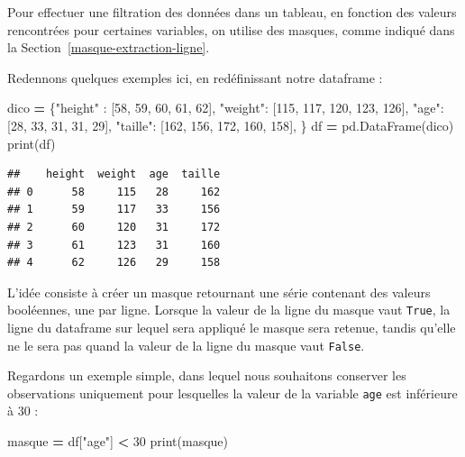 \documentclass[12pt,]{book}
\newenvironment{Shaded}{\begin{snugshade}}{\end{snugshade}}
\newcommand{\DecValTok}[1]{\textcolor[rgb]{0.00,0.00,0.81}{#1}}
\newcommand{\StringTok}[1]{\textcolor[rgb]{0.31,0.60,0.02}{#1}}
\newcommand{\OperatorTok}[1]{\textcolor[rgb]{0.81,0.36,0.00}{\textbf{#1}}}
\newcommand{\BuiltInTok}[1]{#1}
\newcommand{\NormalTok}[1]{#1}
\numberwithin{equation}{section}
\numberwithin{countremarque}{section}
\begin{document}
Pour effectuer une filtration des données dans un tableau, en fonction
des valeurs rencontrées pour certaines variables, on utilise des
masques, comme indiqué dans la Section~\ref{masque-extraction-ligne}.

Redennons quelques exemples ici, en redéfinissant notre dataframe :

\begin{Shaded}
\begin{Highlighting}[]
\NormalTok{dico }\OperatorTok{=}\NormalTok{ \{}\StringTok{"height"}\NormalTok{ : [}\DecValTok{58}\NormalTok{, }\DecValTok{59}\NormalTok{, }\DecValTok{60}\NormalTok{, }\DecValTok{61}\NormalTok{, }\DecValTok{62}\NormalTok{],}
        \StringTok{"weight"}\NormalTok{: [}\DecValTok{115}\NormalTok{, }\DecValTok{117}\NormalTok{, }\DecValTok{120}\NormalTok{, }\DecValTok{123}\NormalTok{, }\DecValTok{126}\NormalTok{],}
        \StringTok{"age"}\NormalTok{: [}\DecValTok{28}\NormalTok{, }\DecValTok{33}\NormalTok{, }\DecValTok{31}\NormalTok{, }\DecValTok{31}\NormalTok{, }\DecValTok{29}\NormalTok{],}
        \StringTok{"taille"}\NormalTok{: [}\DecValTok{162}\NormalTok{, }\DecValTok{156}\NormalTok{, }\DecValTok{172}\NormalTok{, }\DecValTok{160}\NormalTok{, }\DecValTok{158}\NormalTok{],}
\NormalTok{       \} }
\NormalTok{df }\OperatorTok{=}\NormalTok{ pd.DataFrame(dico)}
\BuiltInTok{print}\NormalTok{(df)}
\end{Highlighting}
\end{Shaded}

\begin{lstlisting}
##    height  weight  age  taille
## 0      58     115   28     162
## 1      59     117   33     156
## 2      60     120   31     172
## 3      61     123   31     160
## 4      62     126   29     158
\end{lstlisting}

L'idée consiste à créer un masque retournant une série contenant des
valeurs booléennes, une par ligne. Lorsque la valeur de la ligne du
masque vaut \texttt{True}, la ligne du dataframe sur lequel sera
appliqué le masque sera retenue, tandis qu'elle ne le sera pas quand la
valeur de la ligne du masque vaut \texttt{False}.

Regardons un exemple simple, dans lequel nous souhaitons conserver les
observations uniquement pour lesquelles la valeur de la variable
\texttt{age} est inférieure à 30 :

\begin{Shaded}
\begin{Highlighting}[]
\NormalTok{masque }\OperatorTok{=}\NormalTok{ df[}\StringTok{"age"}\NormalTok{] }\OperatorTok{<} \DecValTok{30}
\BuiltInTok{print}\NormalTok{(masque)}
\end{Highlighting}
\end{Shaded}
\end{document}
